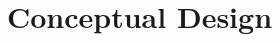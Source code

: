\documentclass{report}
\begin{document}
\chapter{Conceptual Design}\label{ch:conceptual-design}
\end{document}
